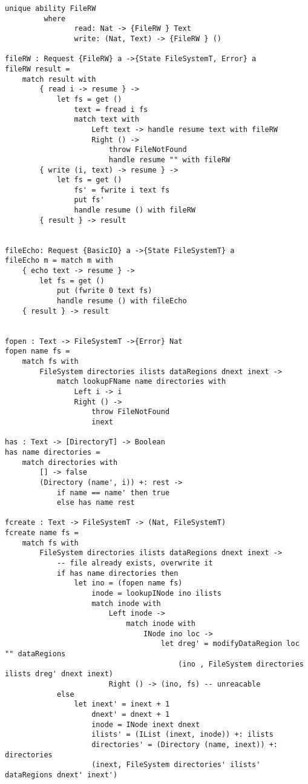 \documentclass[logo,bsc,singlespacing,parskip]{infthesis}
\begin{document}
\begin{lstlisting}[language=unison]
unique ability FileRW
         where
                read: Nat -> {FileRW } Text
                write: (Nat, Text) -> {FileRW } ()

fileRW : Request {FileRW} a ->{State FileSystemT, Error} a
fileRW result =
    match result with
        { read i -> resume } ->
            let fs = get ()
                text = fread i fs
                match text with
                    Left text -> handle resume text with fileRW
                    Right () -> 
                        throw FileNotFound
                        handle resume "" with fileRW
        { write (i, text) -> resume } ->
            let fs = get ()
                fs' = fwrite i text fs
                put fs'
                handle resume () with fileRW
        { result } -> result


fileEcho: Request {BasicIO} a ->{State FileSystemT} a
fileEcho m = match m with 
    { echo text -> resume } -> 
        let fs = get ()
            put (fwrite 0 text fs)
            handle resume () with fileEcho
    { result } -> result


fopen : Text -> FileSystemT ->{Error} Nat
fopen name fs = 
    match fs with
        FileSystem directories ilists dataRegions dnext inext ->
            match lookupFName name directories with
                Left i -> i
                Right () -> 
                    throw FileNotFound
                    inext

has : Text -> [DirectoryT] -> Boolean
has name directories =
    match directories with
        [] -> false
        (Directory (name', i)) +: rest ->
            if name == name' then true
            else has name rest

fcreate : Text -> FileSystemT -> (Nat, FileSystemT)
fcreate name fs = 
    match fs with 
        FileSystem directories ilists dataRegions dnext inext ->
            -- file already exists, overwrite it
            if has name directories then 
                let ino = (fopen name fs)
                    inode = lookupINode ino ilists
                    match inode with
                        Left inode -> 
                            match inode with 
                                INode ino loc ->
                                    let dreg' = modifyDataRegion loc "" dataRegions
                                        (ino , FileSystem directories ilists dreg' dnext inext)
                        Right () -> (ino, fs) -- unreacable
            else 
                let inext' = inext + 1
                    dnext' = dnext + 1
                    inode = INode inext dnext
                    ilists' = (IList (inext, inode)) +: ilists
                    directories' = (Directory (name, inext)) +: directories
                    (inext, FileSystem directories' ilists' dataRegions dnext' inext')


\end{lstlisting}
\end{document}
